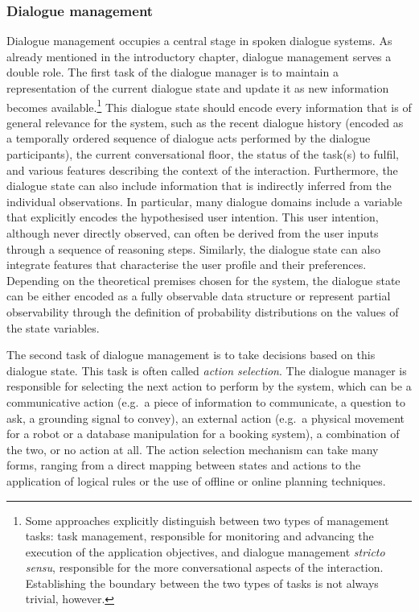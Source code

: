 \subsubsection*{Dialogue management}

Dialogue management occupies a central stage in spoken dialogue systems.  As already mentioned in the introductory chapter, dialogue management serves a double role.  The first task of the dialogue manager is to maintain a representation of the current dialogue state and update it as new information becomes available.\footnote{Some approaches explicitly distinguish between two types of management tasks: task management, responsible for monitoring and advancing the execution of the application objectives, and dialogue management \textit{stricto sensu}, responsible for the more conversational aspects of the interaction. Establishing the boundary between the two types of tasks is not always trivial, however.} This dialogue state should encode every information that is of general relevance for the system, such as the recent dialogue history (encoded as a temporally ordered sequence of dialogue acts performed by the dialogue participants), the current conversational floor, the status of the task(s) to fulfil, and various features describing the context of the interaction.  Furthermore, the dialogue state can also include information that is indirectly inferred from the individual observations. In particular, many dialogue domains include a variable that explicitly encodes the hypothesised user intention.  This user intention, although never directly observed, can often be derived from the user inputs through a sequence of reasoning steps.  Similarly, the dialogue state can also integrate features that characterise the user profile and their preferences. Depending on the theoretical premises chosen for the system, the dialogue state can be either encoded as a fully observable data structure or represent partial observability through the definition of probability distributions on the values of the state variables. 

The second task of dialogue management is to take decisions based on this dialogue state.  This task is often called \textit{action selection}.  The dialogue manager is responsible for selecting the next action to perform by the system, which can be a communicative action (e.g.\ a piece of information to communicate, a question to ask, a grounding signal to convey), an external action (e.g.\ a physical movement for a robot or a database manipulation for a booking system), a combination of the two, or no action at all.  The action selection mechanism can take many forms, ranging from a direct mapping between states and actions to the application of logical rules or the use of offline or online planning techniques. 

